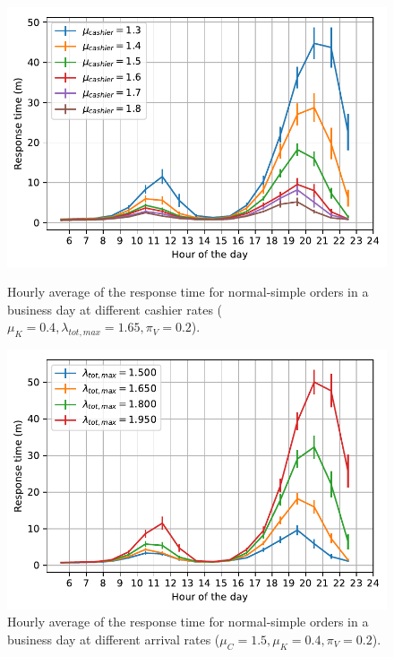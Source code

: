 \begin{figure}[H]
  \begin{minipage}{0.48\textwidth}
    \centering
    \includegraphics[width=\textwidth]{figs/business_day/varying_cashier_rate.pdf}
    \caption{Hourly average of the response time for normal-simple orders in a business day at different cashier rates ($\mu_K=0.4, \lambda_{tot,max} = 1.65, \pi_V=0.2$).}
    \label{fig:bd:var_cr}
  \end{minipage}\hspace{0.03\textwidth}
  \begin{minipage}{0.48\textwidth}
    \centering
    \includegraphics[width=\textwidth]{figs/business_day/varying_arrival_rate.pdf}
    \caption{Hourly average of the response time for normal-simple orders in a business day at different arrival rates ($\mu_C = 1.5, \mu_K=0.4, \pi_V=0.2$).}
    \label{fig:bd:var_ar}
  \end{minipage}
\end{figure}
